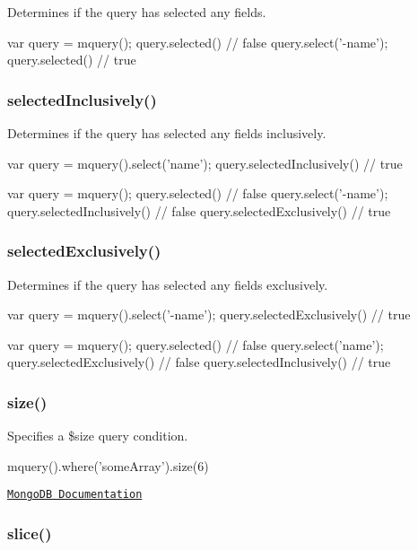 Determines if the query has selected any fields.


\begin{DoxyCode}
var query = mquery();
query.selected() // false
query.select('-name');
query.selected() // true
\end{DoxyCode}


\subsubsection*{selected\+Inclusively()}

Determines if the query has selected any fields inclusively.


\begin{DoxyCode}
var query = mquery().select('name');
query.selectedInclusively() // true

var query = mquery();
query.selected() // false
query.select('-name');
query.selectedInclusively() // false
query.selectedExclusively() // true
\end{DoxyCode}


\subsubsection*{selected\+Exclusively()}

Determines if the query has selected any fields exclusively.


\begin{DoxyCode}
var query = mquery().select('-name');
query.selectedExclusively() // true

var query = mquery();
query.selected() // false
query.select('name');
query.selectedExclusively() // false
query.selectedInclusively() // true
\end{DoxyCode}


\subsubsection*{size()}

Specifies a {\ttfamily \$size} query condition.


\begin{DoxyCode}
mquery().where('someArray').size(6)
\end{DoxyCode}


\href{http://docs.mongodb.org/manual/reference/operator/size/}{\tt Mongo\+DB Documentation}

\subsubsection*{slice()}

